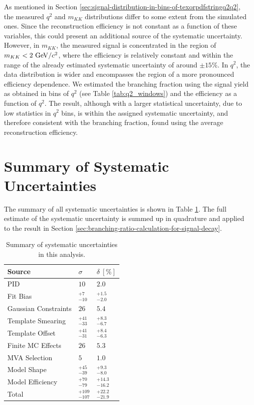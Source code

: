As mentioned in Section \ref{sec:signal-distribution-in-bins-of-texorpdfstringq2q2}, the measured $q^2$ and $m_{KK}$ distributions differ to some extent from the simulated ones. Since the reconstruction efficiency is not constant as a function of these variables, this could present an additional source of the systematic uncertainty. However, in $m_{KK}$, the measured signal is concentrated in the region of $m_{KK}<2\mathrm{~GeV}/c^2$, where the efficiency is relatively constant and within the range of the already estimated systematic uncertainty of around $\pm15\%$. In $q^2$, the data distribution is wider and encompasses the region of a more pronounced efficiency dependence. We estimated the branching fraction using the signal yield as obtained in bins of $q^2$ (see Table \ref{tab:q2_windows}) and the efficiency as a function of $q^2$. The result, although with a larger statistical uncertainty, due to low statistics in $q^2$ bins, is within the assigned systematic uncertainty, and therefore consistent with the branching fraction, found using the average reconstruction efficiency.

\section{Summary of Systematic Uncertainties}

The summary of all systematic uncertainties is shown in Table \ref{tab:sys_summary}. The full estimate of the systematic uncertainty is summed up in quadrature and applied to the result in Section \ref{sec:branching-ratio-calculation-for-signal-decay}.


\begin{table}[H]
	\centering
	\begin{tabular}{l|l|l}
		Source & $\sigma$ & $\delta~[\%]$ \\
		\toprule
		PID & $10$ & $2.0$ \\
		Fit Bias & $ {}^{+7}_{-10}$ & ${}^{+1.5}_{-2.0}$ \\
		Gaussian Constraints & $26$ & $5.4$ \\
		Template Smearing & ${}^{+41}_{-33}$ & ${}^{+8.3}_{-6.7}$ \\
		Template Offset & ${}^{+41}_{-31}$ & ${}^{+8.4}_{-6.3}$ \\
		Finite MC Effects & $26$ & $5.3$ \\
		MVA Selection & $5$ & $1.0$\\
		Model Shape & ${}^{+45}_{-39}$ & ${}^{+9.3}_{-8.0}$ \\
		Model Efficiency & ${}^{+70}_{-79}$ & ${}^{+14.3}_{-16.2}$ \\
		\midrule
		Total & ${} ^{+109}_{-107}$ & ${}^{+22.2}_{-21.9}$ \\
		\bottomrule
	\end{tabular}
	\captionsetup{width=0.8\linewidth}
	\caption{Summary of systematic uncertainties in this analysis.}
	\label{tab:sys_summary}
\end{table}







